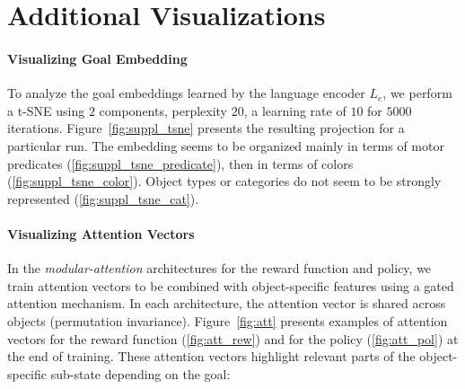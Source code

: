 \begin{itemize}
\end{itemize}

\clearpage
\section{Additional Visualizations}
\label{sec:suppl_visu}

\paragraph{Visualizing Goal Embedding}
To analyze the goal embeddings learned by the language encoder $L_e$, we perform a t-SNE using $2$ components, perplexity $20$, a learning rate of $10$ for $5000$ iterations. Figure~\ref{fig:suppl_tsne} presents the resulting projection for a particular run. The embedding seems to be organized mainly in terms of motor predicates (\ref{fig:suppl_tsne_predicate}), then in terms of colors (\ref{fig:suppl_tsne_color}). Object types or categories do not seem to be strongly represented (\ref{fig:suppl_tsne_cat}). 

\begin{figure*}[!hb]
  \centering
  \caption{\textbf{t-SNE of Goal Embedding.} The same t-SNE is presented, with different color codes (a) predicates, (b) colors, (c) object categories.}
  \label{fig:suppl_tsne}
\end{figure*}   

\paragraph{Visualizing Attention Vectors}

In the \textit{modular-attention} architectures for the reward function and policy, we train attention vectors to be combined with object-specific features using a gated attention mechanism. In each architecture, the attention vector is shared across objects (permutation invariance). Figure~\ref{fig:att} presents examples of attention vectors for the reward function (\ref{fig:att_rew}) and for the policy (\ref{fig:att_pol}) at the end of training. These attention vectors highlight relevant parts of the object-specific sub-state depending on the \NL  goal:

